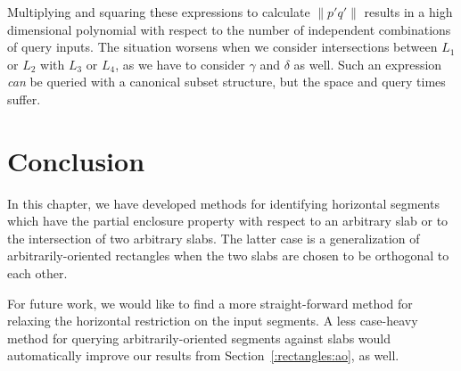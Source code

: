 Multiplying and squaring these expressions to calculate $\|p'q'\|$ results in a high dimensional polynomial with respect to the number of independent combinations of query inputs.
The situation worsens when we consider intersections between $L_1$ or $L_2$ with $L_3$ or $L_4$, as we have to consider $\gamma$ and $\delta$ as well.
Such an expression \emph{can} be queried with a canonical subset structure, but the space and query times suffer.

\section{Conclusion}
\label{:slabs:concl}

In this chapter, we have developed methods for identifying horizontal segments which have the partial enclosure property with respect to an arbitrary slab or to the intersection of two arbitrary slabs.
The latter case is a generalization of arbitrarily-oriented rectangles when the two slabs are chosen to be orthogonal to each other.

For future work, we would like to find a more straight-forward method for relaxing the horizontal restriction on the input segments.  
A less case-heavy method for querying arbitrarily-oriented segments against slabs would automatically improve our results from Section~\ref{:rectangles:ao}, as well.
